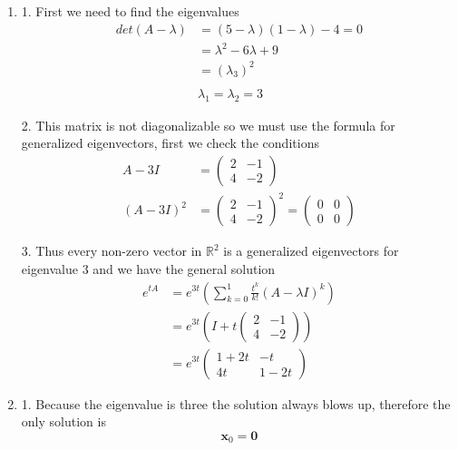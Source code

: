 \documentclass[12pt]{article}
\begin{document}
\begin{enumerate}
  \item [(a)]
        1. First we need to find the eigenvalues
        \begin{align*}
          det(A - \lambda{}) & = (5-\lambda{})(1-\lambda{}) -4 = 0 \\
                             & = \lambda^{2} -6\lambda{} + 9       \\
                             & = (\lambda{}_3)^2                   \\\\
                             & \lambda_{1} = \lambda_{2} = 3
        \end{align*}

        2. This matrix is not diagonalizable so we must use the formula for generalized eigenvectors, first we check the conditions
        \begin{align*}
          A - 3I     & = \begin{pmatrix} 2 & -1 \\ 4 & -2 \end{pmatrix}                                                    \\
          (A - 3I)^2 & =  \begin{pmatrix} 2 & -1 \\ 4 & -2 \end{pmatrix}^2 =  \begin{pmatrix} 0 & 0 \\ 0 & 0 \end{pmatrix}
        \end{align*}

        3. Thus every non-zero vector in $\mathbb{R}^2$ is a generalized eigenvectors for eigenvalue 3 and we have the general solution
        \begin{align*}
          e^{tA} & = e^{3t}(\sum_{k=0}^1\frac{t^k}{k!}(A-\lambda{}I)^k)           \\
                 & = e^{3t}(I + t\begin{pmatrix} 2 & -1 \\ 4 & -2 \end{pmatrix})  \\
                 & = e^{3t}\begin{pmatrix} 1 + 2t & -t \\ 4t & 1-2t \end{pmatrix}
        \end{align*}

  \item [(b)]

        1. Because the eigenvalue is three the solution always blows up, therefore the only solution is
        \[
          \mathbf{x}_0 = \mathbf{0}
        \]

\end{enumerate}
\end{document}
